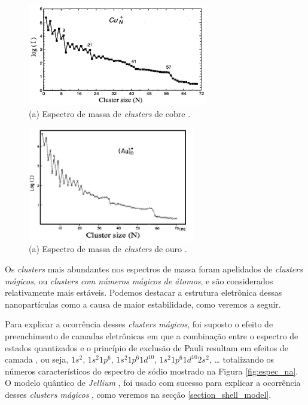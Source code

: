 \begin{figure}
  \centering
  \includegraphics[width=0.7\textwidth]{images/clusters/espec_cu}
  \caption{(a) Espectro de massa de \textit{clusters} de cobre \cite{Heer}.  }
  \label{fig:espec_cu}
\end{figure}

\begin{figure}
  \centering
  \includegraphics[width=0.65\textwidth]{images/clusters/espec_au}
  \caption{(a) Espectro de massa de \textit{clusters} de ouro \cite{KATAKUSE1985229}.  }
  \label{fig:espec_au}
\end{figure}




Os \textit{clusters} mais abundantes
nos espectros de massa foram apelidados de \textit{clusters mágicos}, ou \textit{clusters com números mágicos de átomos}, e são considerados relativamente mais estáveis. Podemos destacar a estrutura eletrônica dessas nanopartículas como a causa de maior estabilidade, como veremos a seguir.

Para explicar a ocorrência desses \textit{clusters mágicos}, foi suposto o efeito de preenchimento de camadas eletrônicas em que a combinação entre o espectro de estados
quantizados e o princípio de exclusão de Pauli resultam em efeitos de camada \cite{Brack}, ou seja, $1s^{2}$, $1s^{2}1p^{6}$, $1s^{2}1p^{6}1d^{10}$, $1s^{2}1p^{6}1d^{10} 2s^{2}$, … totalizando os números característicos do espectro de sódio mostrado na Figura \ref{fig:espec_na}. O modelo quântico de \textit{Jellium} \cite{Heer}, foi usado com sucesso para explicar a ocorrência desses \textit{clusters mágicos} \cite{capitulo_livro_shell}, como veremos na secção \ref{section_shell_model}.

